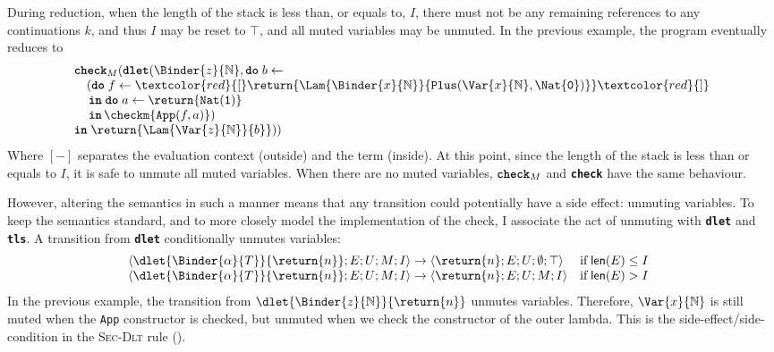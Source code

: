 During reduction, when the length of the stack is less than, or equals to, $I$, there must not be any remaining references to any continuations $k$, and thus $I$ may be reset to $\top$, and all muted variables may be unmuted. In the previous example, the program eventually reduces to 
\[\begin{array}{l}
  \textbf{\texttt{check}}_M(\textbf{\texttt{dlet}}(\Binder{z}{\mathbb{N}}, \textbf{\texttt{do}} \; b \leftarrow \, \\ 
  \quad (\textbf{\texttt{do}} \; f \leftarrow \textcolor{red}{[}\return{\Lam{\Binder{x}{\mathbb{N}}}{\texttt{Plus}(\Var{x}{\mathbb{N}}, \Nat{\texttt{0}})}}\textcolor{red}{]} \\ 
  \, \quad \textbf{\texttt{in}} \; \textbf{\texttt{do}} \; {a}\leftarrow {\return{\texttt{Nat}(\texttt{1})}}\\
  \, \quad \textbf{\texttt{in}} \, {\checkm{\texttt{App}(f, a)}})\; \\
  \textbf{\texttt{in}} \; \return{\Lam{\Var{z}{\mathbb{N}}}{b}})) 
\end{array}\]
Where $[-]$ separates the evaluation context (outside) and the term (inside). At this point, since the length of the stack is less than or equals to $I$, it is safe to unmute all muted variables. When there are no muted variables, $\textbf{\texttt{check}}_M$ and \textbf{\texttt{check}} have the same behaviour.

However, altering the semantics in such a manner means that any transition could potentially have a side effect: unmuting variables. To keep the semantics standard, and to more closely model the implementation of the check, I associate the act of unmuting with \textbf{\texttt{dlet}} and \textbf{\texttt{tls}}. A transition from \textbf{\texttt{dlet}} conditionally unmutes variables: 
\[\begin{array}{@{}ll}
  \langle \dlet{\Binder{\alpha}{T}}{\return{n}}; E; U; M; I \rangle \to \langle \return{n}; E; U; \emptyset; \top\rangle & \text{if} \; \textsf{len}(E) \leq I\\
  \langle \dlet{\Binder{\alpha}{T}}{\return{n}}; E; U; M; I \rangle \to \langle \return{n}; E; U; M; I \rangle & \text{if} \; \textsf{len}(E) > I
\end{array}\] 
In the previous example, the transition from $\dlet{\Binder{z}{\mathbb{N}}}{\return{n}}$ unmutes variables. Therefore, $\Var{x}{\mathbb{N}}$ is still muted when the \texttt{App} constructor is checked, but unmuted when we check the constructor of the outer lambda. 
This is the side-effect/side-condition in the \textsc{Sec-Dlt} rule ().

